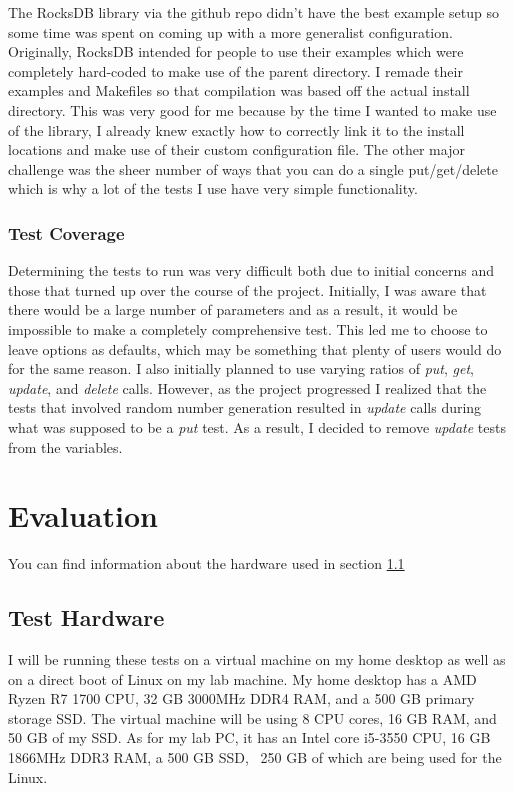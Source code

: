 \documentclass[twocolumn,11pt]{article}
\begin{document}
The RocksDB library via the github repo didn't have the best example setup so
some time was spent on coming up with a more generalist configuration.
Originally, RocksDB intended for people to use their examples which were
completely hard-coded to make use of the parent directory. I remade their
examples and Makefiles so that compilation was based off the actual install
directory. This was very good for me because by the time I wanted to make use of
the library, I already knew exactly how to correctly link it to the install
locations and make use of their custom configuration file. The other major
challenge was the sheer number of ways that you can do a single put/get/delete
which is why a lot of the tests I use have very simple functionality.

\subsubsection{Test Coverage}

Determining the tests to run was very difficult both due to initial concerns and
those that turned up over the course of the project. Initially, I was aware that
there would be a large number of parameters and as a result, it would be
impossible to make a completely comprehensive test. This led me to choose to
leave options as defaults, which may be something that plenty of users would do
for the same reason. I also initially planned to use varying ratios of
\textit{put}, \textit{get}, \textit{update}, and \textit{delete} calls. However,
as the project progressed I realized that the tests that involved random number
generation resulted in \textit{update} calls during what was supposed to be a
\textit{put} test. As a result, I decided to remove \textit{update} tests from
the variables.

\section{Evaluation}

You can find information about the hardware used in section \ref{subsec:test_hw}

\subsection{Test Hardware}
\label{subsec:test_hw}

I will be running these tests on a virtual machine on my home desktop as well as
on a direct boot of Linux on my lab machine. My home desktop has a AMD Ryzen R7
1700 CPU, 32 GB 3000MHz DDR4 RAM, and a 500 GB primary storage SSD. The virtual
machine will be using 8 CPU cores, 16 GB RAM, and 50 GB of my SSD. As for my lab
PC, it has an Intel core i5-3550 CPU, 16 GB 1866MHz DDR3 RAM, a 500 GB SSD, ~250
GB of which are being used for the Linux.
\end{document}
